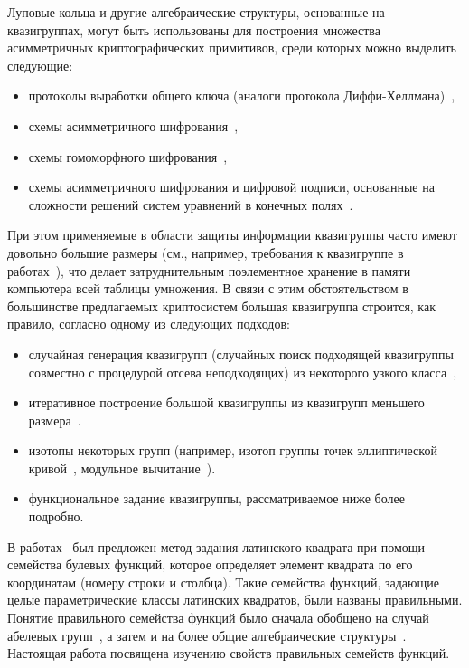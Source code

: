     Луповые кольца и другие алгебраические структуры, основанные на квазигруппах, могут быть использованы для построения множества асимметричных криптографических примитивов, среди которых можно выделить следующие:
    \begin{itemize}
        \item протоколы выработки общего ключа (аналоги протокола Диффи-Хеллмана)~\cite{DH14, DH16, baryshnikov2017key, quantum18},
        \item схемы асимметричного шифрования~\cite{markov12, pke10, gribovphd},
        \item схемы гомоморфного шифрования~\cite{homomo15, gribovphd, katyshev2020application, markov20},
        \item схемы асимметричного шифрования и цифровой подписи, основанные на сложности решений систем уравнений в конечных полях~\cite{gligoroski2008public, gligoroski2008multivariate, chen2010multivariate, gligoroski2011mqq}.
    \end{itemize}

    При этом применяемые в области защиты информации квазигруппы часто имеют довольно большие размеры (см., например, требования к квазигруппе в работах~\cite{EdonR, EdonRprime, chen2010multivariate}), что делает затруднительным поэлементное хранение в памяти компьютера всей таблицы умножения. 
    В связи с этим обстоятельством в большинстве предлагаемых криптосистем большая квазигруппа строится, как правило, согласно одному из следующих подходов:
    \begin{itemize}
        \item случайная генерация квазигрупп (случайных поиск подходящей квазигруппы совместно с процедурой отсева неподходящих) из некоторого узкого класса~\cite{gligoroski2008public, chen2010multivariate},
        \item итеративное построение большой квазигруппы из квазигрупп меньшего размера~\cite{EdonRprime, gribovphd}.
        \item изотопы некоторых  групп (например, изотоп группы точек эллиптической кривой~\cite{DH16}, модульное вычитание~\cite{snavsel2009hash}).
        \item функциональное задание квазигруппы, рассматриваемое ниже более подробно.
    \end{itemize}

    В работах~\cite{nosov98, nosov99} был предложен метод задания латинского квадрата при помощи семейства булевых функций, которое определяет элемент квадрата по его координатам (номеру строки и столбца).
    Такие семейства функций, задающие целые параметрические классы латинских квадратов, были названы правильными.
    Понятие правильного семейства функций было сначала обобщено на случай абелевых групп~\cite{nosov06, nosov06abel, nosov07, nosov08, kozlov08}, а затем и на более общие алгебраические структуры~\cite{plaksina14, galatenko2020latin, galatenko23}.
    Настоящая работа посвящена изучению свойств правильных семейств функций.

